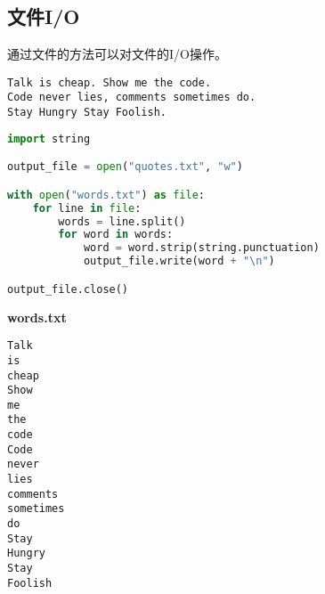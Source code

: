 \subsection{文件I/O}

通过文件的方法可以对文件的I/O操作。\\

\begin{table}[H]
    \centering
    \caption{文件I/O}
\end{table}

\vspace{0.5cm}


\begin{lstlisting}[title=quotes.txt]
Talk is cheap. Show me the code.
Code never lies, comments sometimes do.
Stay Hungry Stay Foolish.
\end{lstlisting}

\begin{lstlisting}[language=Python]
import string

output_file = open("quotes.txt", "w")

with open("words.txt") as file:
    for line in file:
        words = line.split()
        for word in words:
            word = word.strip(string.punctuation)
            output_file.write(word + "\n")

output_file.close()
\end{lstlisting}

\begin{tcolorbox}
    \textbf{words.txt}
    \begin{verbatim}
Talk
is
cheap
Show
me
the
code
Code
never
lies
comments
sometimes
do
Stay
Hungry
Stay
Foolish
	\end{verbatim}
\end{tcolorbox}

